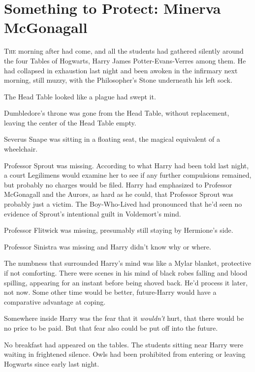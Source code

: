 \chapter{Something to Protect: Minerva McGonagall}

\label{ch-SomethingtoProtectMinervaMcGonagall}

\lettrine{T}{he} morning after
had come, and all the students had gathered silently around the four Tables of
Hogwarts, Harry James Potter-Evans-Verres among them. He had collapsed in
exhaustion last night and been awoken in the infirmary next morning, still
muzzy, with the Philosopher's Stone underneath his left sock.

The Head Table looked like a plague had swept it.

Dumbledore's throne was gone from the Head Table, without replacement, leaving
the center of the Head Table empty.

Severus Snape was sitting in a floating seat, the magical equivalent of a
wheelchair.

Professor Sprout was missing. According to what Harry had been told last night,
a court Legilimens would examine her to see if any further compulsions
remained, but probably no charges would be filed. Harry had emphasized to
Professor McGonagall and the Aurors, as hard as he could, that Professor Sprout
was probably just a victim. The Boy-Who-Lived had pronounced that he'd seen no
evidence of Sprout's intentional guilt in Voldemort's mind.

Professor Flitwick was missing, presumably still staying by Hermione's side.

Professor Sinistra was missing and Harry didn't know why or where.

The numbness that surrounded Harry's mind was like a Mylar blanket, protective
if not comforting. There were scenes in his mind of black robes falling and
blood spilling, appearing for an instant before being shoved back. He'd process
it later, not now. Some other time would be better, future-Harry would have a
comparative advantage at coping.

Somewhere inside Harry was the fear that it \emph{wouldn't} hurt, that there
would be no price to be paid. But that fear also could be put off into the
future.

No breakfast had appeared on the tables. The students sitting near Harry were
waiting in frightened silence. Owls had been prohibited from entering or
leaving Hogwarts since early last night.

